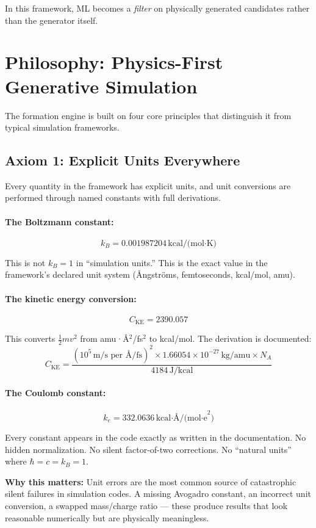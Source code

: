 \documentclass[11pt]{article}
\begin{document}
In this framework, ML becomes a \textit{filter} on physically generated candidates rather than the generator itself.

\section{Philosophy: Physics-First Generative Simulation}

The formation engine is built on four core principles that distinguish it from typical simulation frameworks.

\subsection{Axiom 1: Explicit Units Everywhere}

Every quantity in the framework has explicit units, and unit conversions are performed through named constants with full derivations.

\paragraph{The Boltzmann constant:}
\[
k_B = 0.001987204\,\text{kcal/(mol·K)}
\]

This is not $k_B = 1$ in ``simulation units.'' This is the exact value in the framework's declared unit system (Ångströms, femtoseconds, kcal/mol, amu).

\paragraph{The kinetic energy conversion:}
\[
C_{\text{KE}} = 2390.057
\]

This converts $\frac{1}{2}mv^2$ from amu·Å$^2$/fs$^2$ to kcal/mol. The derivation is documented:
\[
C_{\text{KE}} = \frac{(10^5\,\text{m/s per Å/fs})^2 \times 1.66054\times10^{-27}\,\text{kg/amu} \times N_A}{4184\,\text{J/kcal}}
\]

\paragraph{The Coulomb constant:}
\[
k_e = 332.0636\,\text{kcal·Å/(mol·e}^2\text{)}
\]

Every constant appears in the code exactly as written in the documentation. No hidden normalization. No silent factor-of-two corrections. No ``natural units'' where $\hbar = c = k_B = 1$.

\textbf{Why this matters:} Unit errors are the most common source of catastrophic silent failures in simulation codes. A missing Avogadro constant, an incorrect unit conversion, a swapped mass/charge ratio — these produce results that look reasonable numerically but are physically meaningless.
\end{document}
